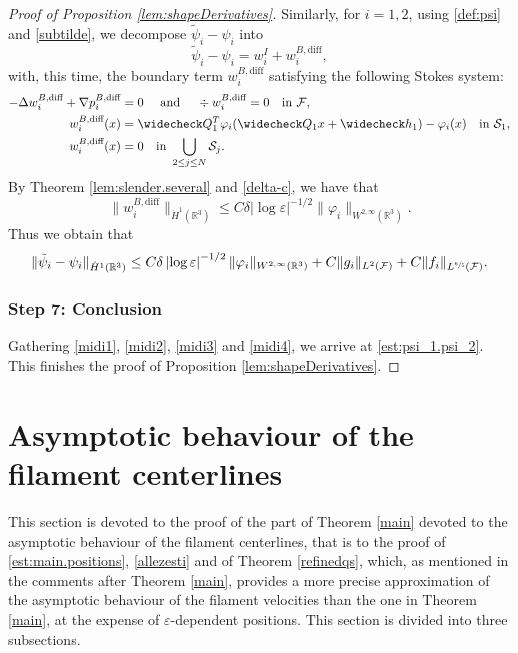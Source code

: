 \documentclass[JEP,XML,SOM,Unicode, NoEqCountersInSection,NoFloatCountersInSection,published]{cedram}
\newcommand{\R}{\mathbb{R}}
\let\eps\varepsilon
\theoremstyle{definition}
\theoremstyle{remark}
\begin{document}
\begin{proof}[Proof of Proposition \ref{lem:shapeDerivatives}]
Similarly, for $i=1,2$, using \eqref{def:psi} and \eqref{subtilde}, we decompose $\tilde \psi_i - \psi_i$ into
\[
\tilde \psi_i - \psi_i = w_i^I + w_i^{B,\textrm{diff}},\]
with, this time, the boundary term $w_i^{B,\textrm{diff}}$ satisfying the following Stokes system:
\begin{align*}
- \Delta w_i^{B,\textrm{diff}} + \nabla p_i^{B,\textrm{diff}} &= 0 \quad \text{ and } \quad\div w_i^{B,\textrm{diff}} = 0 \quad \text{in } \mathcal F, \\
w_i^{B,\textrm{diff}}(x) &= \widecheck Q_1^T \varphi_i(\widecheck Q_1 x + \widecheck h_1) - \varphi_i(x) \quad \text{in } \mathcal S_1, \\
w_i^{B,\textrm{diff}}(x) &= 0 \quad \text{in } \bigcup_{2 \leq j \leq N} \mathcal S_j.
\end{align*}
By Theorem \ref{lem:slender.several} and \eqref{delta-c},
we have that
\begin{equation*}
\|w_i^{B,\textrm{diff}}\|_{\dot H^1(\R^3)} \leq C \delta \left|\log \eps\right|^{-1/2} \| \varphi_i\|_{W^{2,\infty} (\R^3)}.
\end{equation*}
Thus
we obtain that
\begin{equation}
\label{midi3}
\|\tilde \psi_i - \psi_i\|_{\dot H^1(\R^3)} \leq C \delta \left|\log \eps\right|^{-1/2}\| \varphi_i\|_{W^{2,\infty} (\R^3)} + C \|g_i\|_{L^2 (\mathcal F)} + C \|f_i\|_{L^{\sfrac 6 5 } (\mathcal F)}.
\end{equation}

\subsubsection*{Step 7: Conclusion} Gathering \eqref{midi1}, \eqref{midi2},
\eqref{midi3} and \eqref{midi4}, we arrive at \eqref{est:psi_1.psi_2}.
This finishes the proof of Proposition \ref{lem:shapeDerivatives}.
\end{proof}

\section{Asymptotic behaviour of the filament centerlines}
\label{gathered-section}
This section is devoted to the proof of the part of Theorem \ref{main} devoted to the asymptotic behaviour of the filament centerlines, that is to the proof of
\eqref{est:main.positions},
\eqref{allezesti} and of
Theorem \ref{refinedqs}, which, as mentioned in the comments after Theorem \ref{main},
provides a more precise approximation of the asymptotic behaviour of the filament velocities than the one in Theorem \ref{main}, at the expense of $\eps$-dependent positions.
This section is divided into three subsections.
\end{document}
